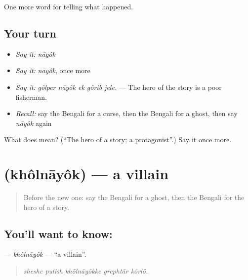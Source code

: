 \begin{grammarlens}[title={What you've built}]
One more word for telling what happened.
\end{grammarlens}

\subsection*{Your turn}
\begin{itemize}
\raggedright
  \item \emph{Say it:} \emph{nāyôk}
  \item \emph{Say it:} \emph{nāyôk}, once more
  \item \emph{Say it:} \emph{gôlper nāyôk ek gôrib jele.} — The hero of the story is a poor fisherman.
  \item \emph{Recall:} say the Bengali for a curse, then the Bengali for a ghost, then say \emph{nāyôk} again
\end{itemize}

\begin{tcolorbox}[breakable,colback=teal!4,colframe=teal!35!black,title={Before you move on}]
What does  mean? (\textquotedblleft{}The hero of a story; a protagonist\textquotedblright{}.) Say it once more.
\end{tcolorbox}
\section[\texorpdfstring{\bn{খলনায়ক} (khôlnāyôk)}{খলনায়ক (khôlnāyôk)}]{ (khôlnāyôk) — a villain}

\label{lesson:BN-C323-kholnayok}



\begin{quote}
Before the new one: say the Bengali for a ghost, then the Bengali for the hero of a story.
\end{quote}

\subsection*{You'll want to know: }
\textbf{} — \emph{khôlnāyôk} — \textquotedblleft{}a villain\textquotedblright{}.

\begin{quote}
    
\end{quote}

\begin{quote}
\emph{sheshe pulish khôlnāyôkke grephtār kôrlô.}
\end{quote}

